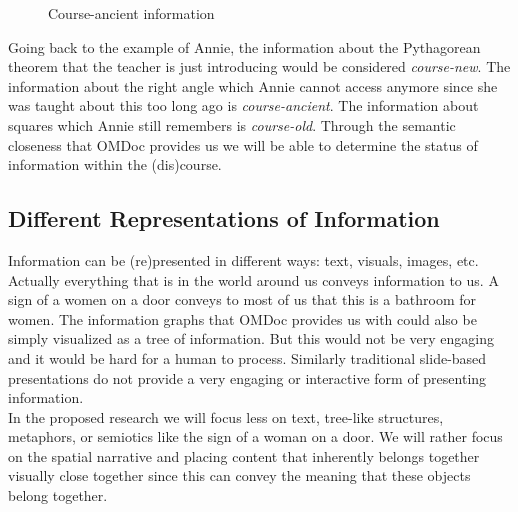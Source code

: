 \documentclass[twoside, 12pt]{article}
\begin{document}
\begin{figure}
\vspace{-26pt}
  \begin{center}
  \end{center}
\vspace{-20pt}
  \caption{Course-ancient information}
  \label{fig:Annie-context}
\vspace{-10pt}
\end{figure}

Going back to the example of Annie, the information about the Pythagorean theorem that the teacher is just introducing would be considered \textit{course-new}. The information about the right angle which Annie cannot access anymore since she was taught about this too long ago is \textit{course-ancient}. The information about squares which Annie still remembers is \textit{course-old}. Through the semantic closeness that OMDoc provides us we will be able to determine the status of information within the (dis)course. \\

\subsection{Different Representations of Information}
\label{sec:inforep}

Information can be (re)presented in different ways: text, visuals, images, etc. Actually everything that is in the world around us conveys information to us. A sign of a women on a door conveys to most of us that this is a bathroom for women. The information graphs that OMDoc provides us with could also be simply visualized as a tree of information. But this would not be very engaging and it would be hard for a human to process. Similarly traditional slide-based presentations do not provide a very engaging or interactive form of presenting information. \\  

In the proposed research we will focus less on text, tree-like structures, metaphors, or semiotics like the sign of a woman on a door. We will rather focus on the spatial narrative and placing content that inherently belongs together visually close together since this can convey the meaning that these objects belong together.\\
\end{document}
